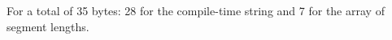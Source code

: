 \begin{minipage}{\linewidth}
\begin{tikzpicture}
\end{tikzpicture}
\label{figure:SegLit2StrEx03SegLen}

\vspace{1em}
For a total of 35 bytes: 28 for the compile-time string and 7 for the array of
segment lengths.

\end{minipage}
